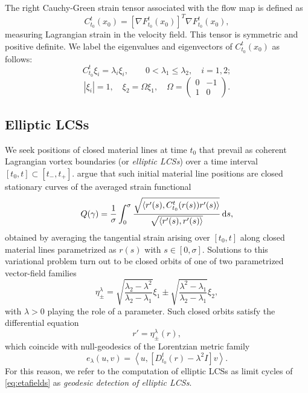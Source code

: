 \documentclass[5p]{elsarticle}
\begin{document}
The right Cauchy-Green strain tensor associated with the flow map is defined as
\begin{equation}
C_{t_0}^t(x_0) = \left[\nabla F_{t_0}^t(x_0)\right]^T \nabla F_{t_0}^t(x_0),
\label{eq:CG}
\end{equation}
measuring Lagrangian strain in the velocity field. This tensor is symmetric and positive definite\citep{truesdell04}. We label the eigenvalues and eigenvectors of $C_{t_0}^t(x_0)$ as follows:
\[
C_{t_0}^t \xi_i = \lambda_i \xi_i, \qquad 0 < \lambda_1 \leq \lambda_2, \quad i = 1,2;
\]
\begin{equation}
\left|\xi_i\right| = 1, \quad \xi_2 = \Omega \xi_1, \quad \Omega = \left(
\begin{array}{rr}
0 & -1\\
1 & 0
\end{array}
\right).
\label{eq:CG_invariants}
\end{equation}

\subsection{Elliptic LCSs}
\label{sec:Elliptic LCSs}

\begin{sloppypar}
We seek positions of closed material lines at time $t_0$ that prevail as coherent Lagrangian vortex boundaries (or \emph{elliptic LCSs}) over a time interval $[t_0,t]\subset[t_-,t_+]$. \citet{haller13:_coher_lagran,haller14:_adden_coher_lagran} argue that such initial material line positions are closed stationary curves of the averaged strain functional
\[
Q(\gamma) = \frac{1}{\sigma} \int_0^{\sigma} \frac{\sqrt{\langle r'(s),C_{t_0}^t(r(s))r'(s)\rangle}}{\sqrt{\langle r'(s),r'(s)\rangle}} \dif s,
\]
obtained by averaging the tangential strain arising over $[t_0,t]$ along closed material lines parametrized as $r(s)$ with $s \in [0,\sigma].$
Solutions to this variational problem turn out to be closed orbits of one of two parametrized vector-field families
\begin{equation}
\eta_\pm^\lambda = \sqrt{\frac{\lambda_2 - \lambda^2}{\lambda_2 - \lambda_1}} \xi_1 \pm \sqrt{\frac{\lambda^2 - \lambda_1}{\lambda_2 - \lambda_1}}\xi_2,
\label{eq:eta}
\end{equation}
with $\lambda > 0$ playing the role of a parameter. Such closed orbits satisfy the differential equation
\begin{equation}
r' = \eta_\pm^\lambda(r),
\label{eq:etafields}
\end{equation}
which coincide with null-geodesics of the Lorentzian metric family 
\[
e_\lambda(u,v) = \left\langle u,\left[D_{t_0}^t(r) - \lambda^2 I\right] v \right\rangle.
\]
For this reason, we refer to the computation of elliptic LCSs as limit cycles of \cref{eq:etafields} as \emph{geodesic detection of elliptic LCSs}.
\end{sloppypar}
\end{document}
